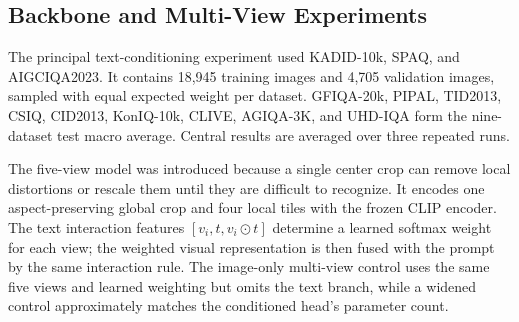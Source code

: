 \documentclass{article}
\begin{document}
\begin{table}[htbp]
\centering
\small
\setlength{\tabcolsep}{5pt}
\caption{Scoring-head depth and capacity controls. Total parameters include the frozen vision encoder.}
\label{tab:text-capacity}
\end{table}

\subsection{Backbone and Multi-View Experiments}

The principal text-conditioning experiment used KADID-10k, SPAQ, and AIGCIQA2023. It contains 18,945 training images and 4,705 validation images, sampled with equal expected weight per dataset. GFIQA-20k, PIPAL, TID2013, CSIQ, CID2013, KonIQ-10k, CLIVE, AGIQA-3K, and UHD-IQA form the nine-dataset test macro average. Central results are averaged over three repeated runs.

The five-view model was introduced because a single center crop can remove local distortions or rescale them until they are difficult to recognize. It encodes one aspect-preserving global crop and four local tiles with the frozen CLIP encoder. The text interaction features $[v_i,t,v_i\odot t]$ determine a learned softmax weight for each view; the weighted visual representation is then fused with the prompt by the same interaction rule. The image-only multi-view control uses the same five views and learned weighting but omits the text branch, while a widened control approximately matches the conditioned head's parameter count.
\end{document}
